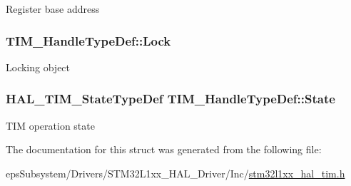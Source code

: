 Register base address \hypertarget{struct_t_i_m___handle_type_def_a2a24b963b57150ed2fb0f051cd87b65a}{
\subsubsection[{Lock}]{ T\-I\-M\-\_\-\-Handle\-Type\-Def\-::\-Lock}}\label{struct_t_i_m___handle_type_def_a2a24b963b57150ed2fb0f051cd87b65a}
Locking object \hypertarget{struct_t_i_m___handle_type_def_a6b6eeaf94f2e6e3d0a5bdac44adf21d6}{
\subsubsection[{State}]{ {\bf H\-A\-L\-\_\-\-T\-I\-M\-\_\-\-State\-Type\-Def} T\-I\-M\-\_\-\-Handle\-Type\-Def\-::\-State}}\label{struct_t_i_m___handle_type_def_a6b6eeaf94f2e6e3d0a5bdac44adf21d6}
T\-I\-M operation state 

The documentation for this struct was generated from the following file\-:\begin{DoxyCompactItemize}
\item 
eps\-Subsystem/\-Drivers/\-S\-T\-M32\-L1xx\-\_\-\-H\-A\-L\-\_\-\-Driver/\-Inc/\hyperlink{stm32l1xx__hal__tim_8h}{stm32l1xx\-\_\-hal\-\_\-tim.\-h}\end{DoxyCompactItemize}
